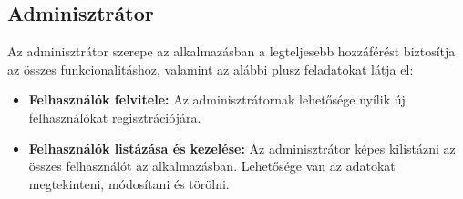 \subsection{Adminisztrátor}

Az adminisztrátor szerepe az alkalmazásban a legteljesebb hozzáférést biztosítja az összes funkcionalitáshoz, valamint az alábbi plusz feladatokat látja el:

\begin{itemize}

\item \textbf{Felhasználók felvitele:} Az adminisztrátornak lehetősége nyílik új felhasználókat regisztrációjára.

\item \textbf{Felhasználók listázása és kezelése:} Az adminisztrátor képes kilistázni az összes felhasználót az alkalmazásban. Lehetősége van az adatokat megtekinteni, módosítani és törölni.

\end{itemize}
